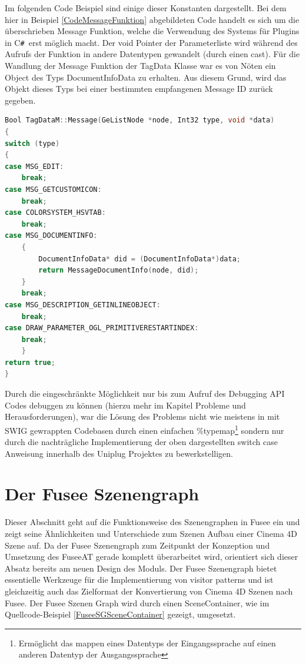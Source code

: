 \documentclass[pagesize, paper=a4, fontsize=12pt, titlepage=true, headings=small, headnosepline, abstractoff, liststotoc, nochapterprefix, plainheadsepline, twoside]{scrreprt}
\newcommand{\CSS}{C\texttt{\# }}
\begin{document}
Im folgenden Code Beispiel sind einige dieser Konstanten dargestellt. Bei dem hier in Beispiel \ref{CodeMessageFunktion} abgebildeten Code handelt es sich um die überschrieben Message Funktion, welche die Verwendung des Systems für Plugins in \CSS erst möglich macht. Der void Pointer der Parameterliste wird während des Aufrufs der Funktion in andere Datentypen gewandelt (durch einen cast). Für die Wandlung der Message Funktion der TagData Klasse war es von Nöten ein Object des Typs DocumentInfoData zu erhalten. Aus diesem Grund, wird das Objekt dieses Typs bei einer bestimmten empfangenen Message ID zurück gegeben.
\begin{lstlisting}[language=C++, caption = Überschreiben der Message Funktion des TagData Datentyps, label=CodeMessageFunktion]
Bool TagDataM::Message(GeListNode *node, Int32 type, void *data)
{
switch (type)
{
case MSG_EDIT:
	break;
case MSG_GETCUSTOMICON:
	break;
case COLORSYSTEM_HSVTAB:
	break;
case MSG_DOCUMENTINFO:
	{
		DocumentInfoData* did = (DocumentInfoData*)data;
		return MessageDocumentInfo(node, did);
	}
	break;
case MSG_DESCRIPTION_GETINLINEOBJECT:
	break;
case DRAW_PARAMETER_OGL_PRIMITIVERESTARTINDEX:
	break;
	}
return true;
}
\end{lstlisting}

Durch die eingeschränkte  Möglichkeit nur bis zum Aufruf des Debugging API Codes debuggen zu können (hierzu mehr im Kapitel Probleme und Herausforderungen), war die Lösung des Problems nicht wie meistens in mit SWIG gewrappten Codebasen durch einen einfachen \%typemap\footnote{Ermöglicht das mappen eines Datentyps der Eingangssprache auf einen anderen Datentyp der Ausgangssprache} sondern nur durch die nachträgliche Implementierung der oben dargestellten switch case Anweisung innerhalb des Uniplug Projektes zu bewerkstelligen. 

\section{Der Fusee Szenengraph}
Dieser Abschnitt geht auf die Funktionsweise des Szenengraphen in Fusee ein und zeigt seine Ähnlichkeiten und Unterschiede zum Szenen Aufbau einer Cinema 4D Szene auf. Da der Fusee Szenengraph zum Zeitpunkt der Konzeption und Umsetzung des FuseeAT gerade komplett überarbeitet wird, orientiert sich dieser Absatz bereits am neuen Design des Moduls. Der Fusee Szenengraph bietet essentielle Werkzeuge für die Implementierung von visitor patterns und ist gleichzeitig auch das Zielformat der Konvertierung von Cinema 4D Szenen nach Fusee. Der Fusee Szenen Graph wird durch einen SceneContainer, wie im Quellcode-Beispiel \ref{FuseeSGSceneContainer} gezeigt, umgesetzt.
\end{document}

